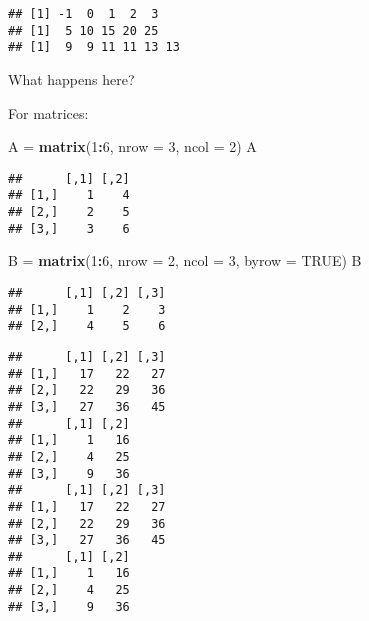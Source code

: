 \documentclass[]{article}
\newenvironment{Shaded}{\begin{snugshade}}{\end{snugshade}}
\newcommand{\KeywordTok}[1]{\textcolor[rgb]{0.13,0.29,0.53}{\textbf{#1}}}
\newcommand{\DataTypeTok}[1]{\textcolor[rgb]{0.13,0.29,0.53}{#1}}
\newcommand{\DecValTok}[1]{\textcolor[rgb]{0.00,0.00,0.81}{#1}}
\newcommand{\StringTok}[1]{\textcolor[rgb]{0.31,0.60,0.02}{#1}}
\newcommand{\CommentTok}[1]{\textcolor[rgb]{0.56,0.35,0.01}{\textit{#1}}}
\newcommand{\OtherTok}[1]{\textcolor[rgb]{0.56,0.35,0.01}{#1}}
\newcommand{\OperatorTok}[1]{\textcolor[rgb]{0.81,0.36,0.00}{\textbf{#1}}}
\newcommand{\NormalTok}[1]{#1}
\begin{document}
\begin{verbatim}
## [1] -1  0  1  2  3
## [1]  5 10 15 20 25
## [1]  9  9 11 11 13 13
\end{verbatim}

What happens here?

For matrices:

\begin{Shaded}
\begin{Highlighting}[]
\NormalTok{A =}\StringTok{ }\KeywordTok{matrix}\NormalTok{(}\DecValTok{1}\OperatorTok{:}\DecValTok{6}\NormalTok{, }\DataTypeTok{nrow =} \DecValTok{3}\NormalTok{, }\DataTypeTok{ncol =} \DecValTok{2}\NormalTok{)}
\NormalTok{A}
\end{Highlighting}
\end{Shaded}

\begin{verbatim}
##      [,1] [,2]
## [1,]    1    4
## [2,]    2    5
## [3,]    3    6
\end{verbatim}

\begin{Shaded}
\begin{Highlighting}[]
\NormalTok{B =}\StringTok{ }\KeywordTok{matrix}\NormalTok{(}\DecValTok{1}\OperatorTok{:}\DecValTok{6}\NormalTok{, }\DataTypeTok{nrow =} \DecValTok{2}\NormalTok{, }\DataTypeTok{ncol =} \DecValTok{3}\NormalTok{, }\DataTypeTok{byrow =} \OtherTok{TRUE}\NormalTok{)}
\NormalTok{B}
\end{Highlighting}
\end{Shaded}

\begin{verbatim}
##      [,1] [,2] [,3]
## [1,]    1    2    3
## [2,]    4    5    6
\end{verbatim}

\begin{Shaded}
\end{Shaded}

\begin{verbatim}
##      [,1] [,2] [,3]
## [1,]   17   22   27
## [2,]   22   29   36
## [3,]   27   36   45
##      [,1] [,2]
## [1,]    1   16
## [2,]    4   25
## [3,]    9   36
##      [,1] [,2] [,3]
## [1,]   17   22   27
## [2,]   22   29   36
## [3,]   27   36   45
##      [,1] [,2]
## [1,]    1   16
## [2,]    4   25
## [3,]    9   36
\end{verbatim}
\end{document}
